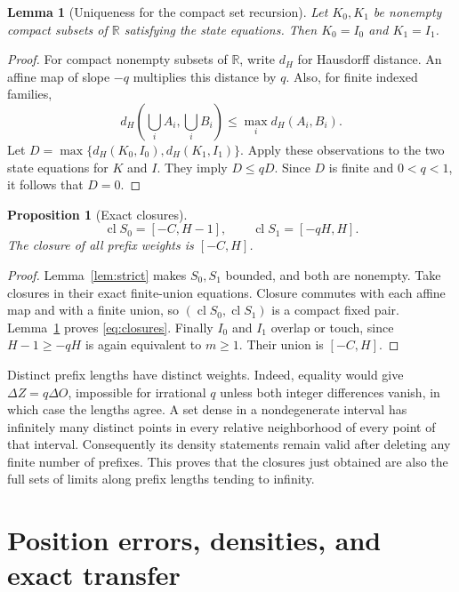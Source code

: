 \documentclass[11pt]{article}
\numberwithin{equation}{section}
\newtheorem{lemma}[theorem]{Lemma}
\newtheorem{proposition}[theorem]{Proposition}
\theoremstyle{definition}
\theoremstyle{remark}
\newcommand{\R}{\mathbb{R}}
\newcommand{\cl}{\operatorname{cl}}
\begin{document}
\begin{lemma}[Uniqueness for the compact set recursion]\label{lem:hausdorff}
Let $K_0,K_1$ be nonempty compact subsets of $\R$ satisfying the state
equations. Then $K_0=I_0$ and $K_1=I_1$.
\end{lemma}
\begin{proof}
For compact nonempty subsets of $\R$, write $d_H$ for Hausdorff distance.
An affine map of slope $-q$ multiplies this distance by $q$.
Also, for finite indexed families,
\[
d_H\left(\bigcup_i A_i,\bigcup_i B_i\right)
\le\max_i d_H(A_i,B_i).
\]
Let $D=\max\{d_H(K_0,I_0),d_H(K_1,I_1)\}$. Apply these observations to
the two state equations for $K$ and $I$. They imply $D\le qD$.
Since $D$ is finite and $0<q<1$, it follows that $D=0$.
\end{proof}

\begin{proposition}[Exact closures]\label{prop:closures}
\begin{equation}\label{eq:closures}
\cl S_0=[-C,H-1],\qquad \cl S_1=[-qH,H].
\end{equation}
The closure of all prefix weights is $[-C,H]$.
\end{proposition}
\begin{proof}
Lemma~\ref{lem:strict} makes $S_0,S_1$ bounded, and both are nonempty.
Take closures in their exact finite-union equations. Closure commutes
with each affine map and with a finite union, so $(\cl S_0,\cl S_1)$ is
a compact fixed pair. Lemma~\ref{lem:hausdorff} proves \eqref{eq:closures}.
Finally $I_0$ and $I_1$ overlap or touch, since
$H-1\ge-qH$ is again equivalent to $m\ge1$. Their union is $[-C,H]$.
\end{proof}

Distinct prefix lengths have distinct weights. Indeed, equality would
give $\Delta Z=q\Delta O$, impossible for irrational $q$ unless both
integer differences vanish, in which case the lengths agree. A set dense
in a nondegenerate interval has infinitely many distinct points in every
relative neighborhood of every point of that interval. Consequently its
density statements remain valid after deleting any finite number of
prefixes. This proves that the closures just obtained are also the full
sets of limits along prefix lengths tending to infinity.

\section{Position errors, densities, and exact transfer}\label{sec:positions}
\end{document}
